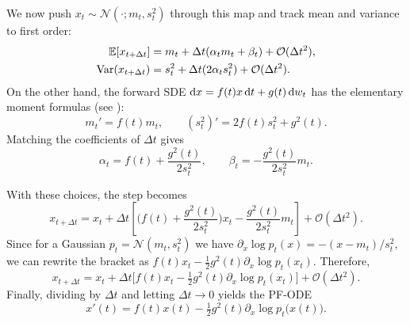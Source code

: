 

We now push $x_t\sim\mathcal N(\cdot;m_t,s_t^2)$ through this map and track mean and variance to first order:
\begin{align*}
\mathbb E[x_{t+\Delta t}]
&= m_t+\Delta t(\alpha_t m_t+\beta_t)+\mathcal{O}(\Delta t^2),
\\
\mathrm{Var}(x_{t+\Delta t})
&= s_t^2+\Delta t (2\alpha_t s_t^2)+\mathcal{O}(\Delta t^2).
\end{align*}
On the other hand, the forward SDE $\mathop{}\!\mathrm{d} x=f(t) x \mathop{}\!\mathrm{d} t+g(t) \mathop{}\!\mathrm{d} w_t$ has the elementary moment formulas (see ):
\[
m_t' = f(t) m_t,
\qquad
(s_t^2)' = 2 f(t) s_t^2 + g^2(t).
\]
Matching the coefficients of $\Delta t$ gives
\[
\alpha_t = f(t)+\frac{g^2(t)}{2 s_t^2},
\qquad
\beta_t = - \frac{g^2(t)}{2 s_t^2} m_t.
\]

With these choices, the step becomes
\[
x_{t+\Delta t}
= x_t + \Delta t\!\left[\Big(f(t)+\frac{g^2(t)}{2s_t^2}\Big)x_t
-\frac{g^2(t)}{2s_t^2} m_t\right]+\mathcal{O}(\Delta t^2).
\]
Since for a Gaussian $p_t=\mathcal N(m_t,s_t^2)$ we have $\partial_x\log p_t(x)=-(x-m_t)/s_t^2$, we can rewrite the bracket as
$f(t) x_t - \tfrac12 g^2(t) \partial_x\log p_t(x_t)$.
Therefore,
\[
x_{t+\Delta t}
= x_t + \Delta t\Big[f(t) x_t - \tfrac12 g^2(t) \partial_x\log p_t(x_t)\Big] + \mathcal{O}(\Delta t^2).
\]
Finally, dividing by $\Delta t$ and letting $\Delta t\to 0$ yields the PF-ODE
\[
x'(t)  =  f(t) x(t)  -  \tfrac12 g^2(t) \partial_x\log p_t\!\big(x(t)\big).
\]

